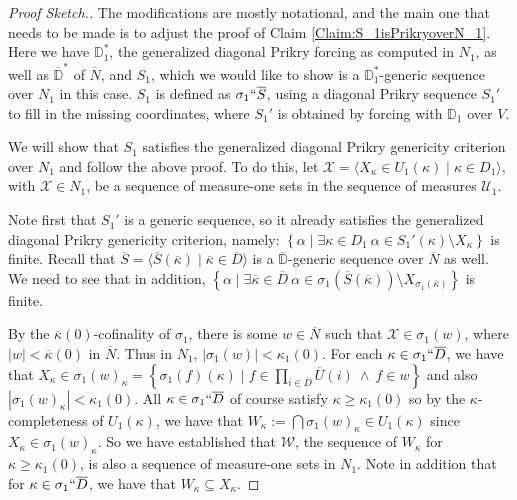 \documentclass{amsart}
\theoremstyle{definition}
\theoremstyle{remark}
\newcommand{\D}{\mathbb{D}}
\newcommand{\N}{{\overline{N}}}
\renewcommand{\S}{{\overline{S}}}
\newcommand{\U}{\mathcal{U}}
\newcommand{\st}{\; | \;}
\newcommand{\set}[2]{\left\{#1\st #2 \right\}}
\newcommand{\seq}[2]{\langle #1 \st #2 \rangle}
\begin{document}
\begin{proof}[Proof Sketch.]
The modifications are mostly notational, and the main one that needs to be made is to adjust the proof of Claim \ref{Claim:S_1isPrikryoverN_1}. Here we have $\D^*_1$, the generalized diagonal Prikry forcing as computed in $N_1$, as well as $\overline{\D}^*$ of $\N$, 
and $S_1$, which we would like to show is a $\D_1^*$-generic sequence over $N_1$ in this case. $S_1$ is defined as $\sigma_1 ``\overline S$, using a diagonal Prikry sequence $S_1'$ to fill in the missing coordinates, where $S_1'$ is obtained by forcing with $\D_1$ over $V$.

We will show that $S_1$ satisfies the generalized diagonal Prikry genericity criterion over $N_1$ and follow the above proof. To do this, let $\mathcal X = \seq{ X_\kappa \in U_1(\kappa) }{ \kappa \in D_1 }$, with $\mathcal X \in N_1$, be a sequence of measure-one sets in the sequence of measures $\U_1$.

Note first that $S_1'$ is a generic sequence, so it already satisfies the generalized diagonal Prikry genericity criterion, namely:
$\set{ \alpha }{ \exists \kappa \in D_1 \ \alpha \in S_1'(\kappa) \setminus X_\kappa }$ is finite.
Recall that $\S = \seq{ \S(\overline \kappa) }{ \overline \kappa \in \overline D }$ is a $\overline{\D}$-generic sequence over $\N$ as well.
We need to see that in addition, $\set{ \alpha }{ \exists \overline \kappa \in \overline D \ \alpha \in \sigma_1(\S(\overline \kappa)) \setminus X_{\sigma_1(\overline \kappa)} }$ is finite.

By the $\overline{\kappa}(0)$-cofinality of $\sigma_1$, there is some $w \in \N$ such that $\mathcal X \in \sigma_1(w)$, where $|w| < \overline{\kappa}(0)$ in $\N$. Thus in $N_1$, $|\sigma_1(w)| < \kappa_1(0)$. 
For each $\kappa \in \sigma_1``\overline D$, we have that $X_\kappa \in \sigma_1(w)_\kappa = \set{\sigma_1(f)( \kappa) }{ f \in \prod_{i \in \overline D} \overline U(i) \ \land \ f \in w }$ and also $|\sigma_1(w)_\kappa|<\kappa_1(0).$ All $\kappa \in \sigma_1``\overline D$ of course satisfy $\kappa \geq \kappa_1(0)$ so by the $\kappa$-completeness of $U_1(\kappa)$, we have that $W_\kappa := \bigcap \sigma_1(w)_\kappa \in U_1(\kappa)$ since $X_\kappa \in \sigma_1(w)_\kappa$.
So we have established that $\mathcal W$, the sequence of $W_\kappa$ for $\kappa \geq \kappa_1(0)$, is also a sequence of measure-one sets in $N_1$. Note in addition that for $\kappa \in \sigma_1``\overline D$, we have that $W_\kappa \subseteq X_\kappa$. 


\end{proof}
\end{document}
